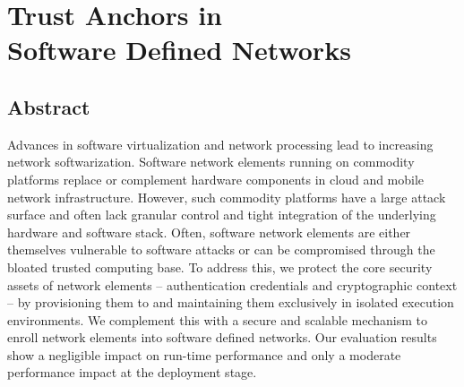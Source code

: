 \chapter[\paperIIItitle]{\texorpdfstring{%
		Trust Anchors in\\Software Defined Networks}{%
		\paperIIItitle}}
\label{ch:trustanchors}
\paperRemark{\paperIIIref}

{

%

\newcommand*\circled[1]{\tikz[baseline=(char.base)]{
            \node[shape=circle,draw,inner sep=1pt, color=white,fill=black] (char) {#1};}}





%
%
%
%
%

\section*{Abstract}
Advances in software virtualization and network processing lead to increasing network softwarization.
Software network elements running on commodity platforms replace or complement hardware components in cloud and mobile network infrastructure.
However, such commodity platforms have a large attack surface and often lack granular control and tight integration of the underlying hardware and software stack.
Often, software network elements are either themselves vulnerable to software attacks or can be compromised through the bloated trusted computing base.
To address this, we protect the core security assets of network elements -- authentication credentials and cryptographic context -- by provisioning them to and maintaining them exclusively in isolated execution environments.
We complement this with a secure and scalable mechanism to enroll network elements into software defined networks.
Our evaluation results show a negligible impact on run-time performance and only a moderate performance impact at the deployment stage.

}
